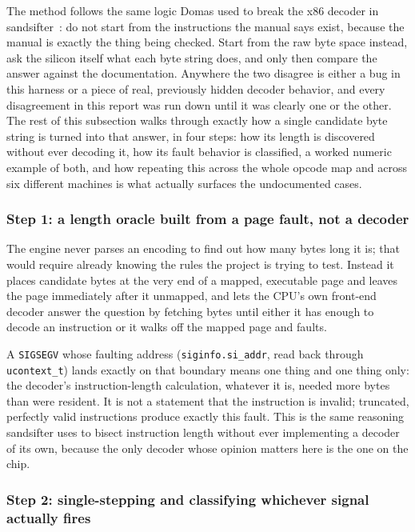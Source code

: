 \documentclass[11pt]{article}
\newcommand{\code}[1]{\texttt{#1}}
\begin{document}
The method follows the same logic Domas used to break the x86 decoder in
sandsifter~\cite{domas2017}: do not start from the instructions the
manual says exist, because the manual is exactly the thing being
checked. Start from the raw byte space instead, ask the silicon itself
what each byte string does, and only then compare the answer against the
documentation. Anywhere the two disagree is either a bug in this
harness or a piece of real, previously hidden decoder behavior, and
every disagreement in this report was run down until it was clearly one
or the other. The rest of this subsection walks through exactly how a
single candidate byte string is turned into that answer, in four steps:
how its length is discovered without ever decoding it, how its fault
behavior is classified, a worked numeric example of both, and how
repeating this across the whole opcode map and across six different
machines is what actually surfaces the undocumented cases.

\subsubsection{Step 1: a length oracle built from a page fault, not a decoder}

The engine never parses an encoding to find out how many bytes long it
is; that would require already knowing the rules the project is trying
to test. Instead it places candidate bytes at the very end of a mapped,
executable page and leaves the page immediately after it unmapped, and
lets the CPU's own front-end decoder answer the question by fetching
bytes until either it has enough to decode an instruction or it walks
off the mapped page and faults.

A \code{SIGSEGV} whose faulting address (\code{siginfo.si\_addr}, read
back through \code{ucontext\_t}) lands exactly on that boundary means
one thing and one thing only: the decoder's instruction-length
calculation, whatever it is, needed more bytes than were resident. It
is not a statement that the instruction is invalid; truncated, perfectly
valid instructions produce exactly this fault. This is the same
reasoning sandsifter uses to bisect instruction length without ever
implementing a decoder of its own, because the only decoder whose
opinion matters here is the one on the chip.

\subsubsection{Step 2: single-stepping and classifying whichever signal actually fires}
\end{document}
